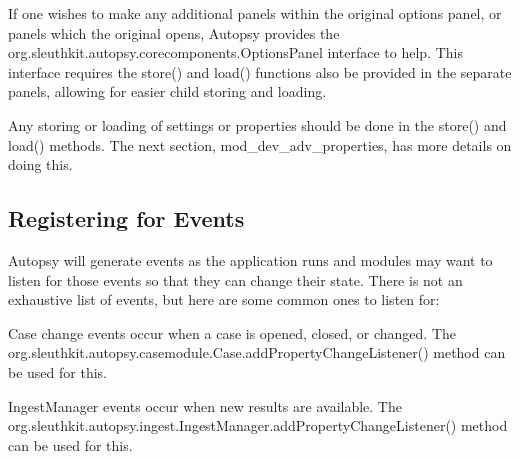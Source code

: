 If one wishes to make any additional panels within the original options panel, or panels which the original opens, Autopsy provides the org.\+sleuthkit.\+autopsy.\+corecomponents.\+Options\+Panel interface to help. This interface requires the {\ttfamily store()} and {\ttfamily load()} functions also be provided in the separate panels, allowing for easier child storing and loading.

Any storing or loading of settings or properties should be done in the {\ttfamily store()} and {\ttfamily load()} methods. The next section, mod\+\_\+dev\+\_\+adv\+\_\+properties, has more details on doing this.\hypertarget{adv_dev_page_mod_dev_adv_events}{}\subsection{Registering for Events}\label{adv_dev_page_mod_dev_adv_events}
Autopsy will generate events as the application runs and modules may want to listen for those events so that they can change their state. There is not an exhaustive list of events, but here are some common ones to listen for\+:


\begin{DoxyItemize}
\item Case change events occur when a case is opened, closed, or changed. The org.\+sleuthkit.\+autopsy.\+casemodule.\+Case.\+add\+Property\+Change\+Listener() method can be used for this.
\item Ingest\+Manager events occur when new results are available. The org.\+sleuthkit.\+autopsy.\+ingest.\+Ingest\+Manager.\+add\+Property\+Change\+Listener() method can be used for this. 
\end{DoxyItemize}
